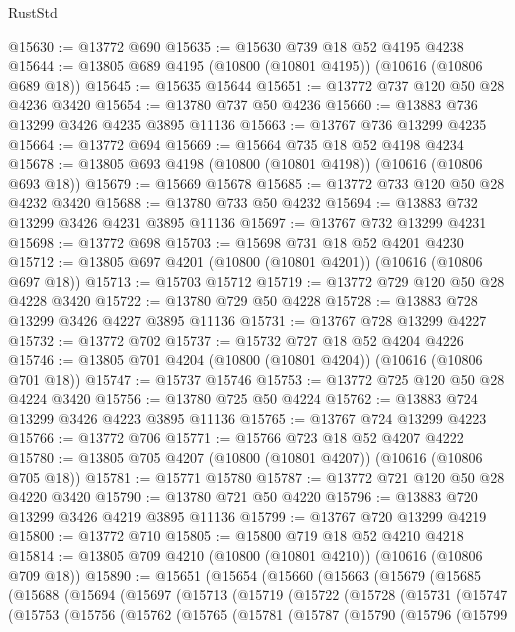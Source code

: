 \begin{lexlean}{RustStd}
\begin{coremodule}
@15630 := @13772 @690
@15635 := @15630 @739 @18 @52 @4195 @4238
@15644 := @13805 @689 @4195 (@10800 (@10801 @4195)) (@10616 (@10806 @689 @18))
@15645 := @15635 @15644
@15651 := @13772 @737 @120 @50 @28 @4236 @3420
@15654 := @13780 @737 @50 @4236
@15660 := @13883 @736 @13299 @3426 @4235 @3895 @11136
@15663 := @13767 @736 @13299 @4235
@15664 := @13772 @694
@15669 := @15664 @735 @18 @52 @4198 @4234
@15678 := @13805 @693 @4198 (@10800 (@10801 @4198)) (@10616 (@10806 @693 @18))
@15679 := @15669 @15678
@15685 := @13772 @733 @120 @50 @28 @4232 @3420
@15688 := @13780 @733 @50 @4232
@15694 := @13883 @732 @13299 @3426 @4231 @3895 @11136
@15697 := @13767 @732 @13299 @4231
@15698 := @13772 @698
@15703 := @15698 @731 @18 @52 @4201 @4230
@15712 := @13805 @697 @4201 (@10800 (@10801 @4201)) (@10616 (@10806 @697 @18))
@15713 := @15703 @15712
@15719 := @13772 @729 @120 @50 @28 @4228 @3420
@15722 := @13780 @729 @50 @4228
@15728 := @13883 @728 @13299 @3426 @4227 @3895 @11136
@15731 := @13767 @728 @13299 @4227
@15732 := @13772 @702
@15737 := @15732 @727 @18 @52 @4204 @4226
@15746 := @13805 @701 @4204 (@10800 (@10801 @4204)) (@10616 (@10806 @701 @18))
@15747 := @15737 @15746
@15753 := @13772 @725 @120 @50 @28 @4224 @3420
@15756 := @13780 @725 @50 @4224
@15762 := @13883 @724 @13299 @3426 @4223 @3895 @11136
@15765 := @13767 @724 @13299 @4223
@15766 := @13772 @706
@15771 := @15766 @723 @18 @52 @4207 @4222
@15780 := @13805 @705 @4207 (@10800 (@10801 @4207)) (@10616 (@10806 @705 @18))
@15781 := @15771 @15780
@15787 := @13772 @721 @120 @50 @28 @4220 @3420
@15790 := @13780 @721 @50 @4220
@15796 := @13883 @720 @13299 @3426 @4219 @3895 @11136
@15799 := @13767 @720 @13299 @4219
@15800 := @13772 @710
@15805 := @15800 @719 @18 @52 @4210 @4218
@15814 := @13805 @709 @4210 (@10800 (@10801 @4210)) (@10616 (@10806 @709 @18))
@15890 := @15651
    (@15654
      (@15660
        (@15663
          (@15679
            (@15685
              (@15688
                (@15694
                  (@15697
                    (@15713
                      (@15719
                        (@15722
                          (@15728
                            (@15731
                              (@15747
                                (@15753
                                  (@15756
                                    (@15762
                                      (@15765
                                        (@15781
                                          (@15787
                                            (@15790
                                              (@15796
                                                (@15799

\end{coremodule}
\end{lexlean}
